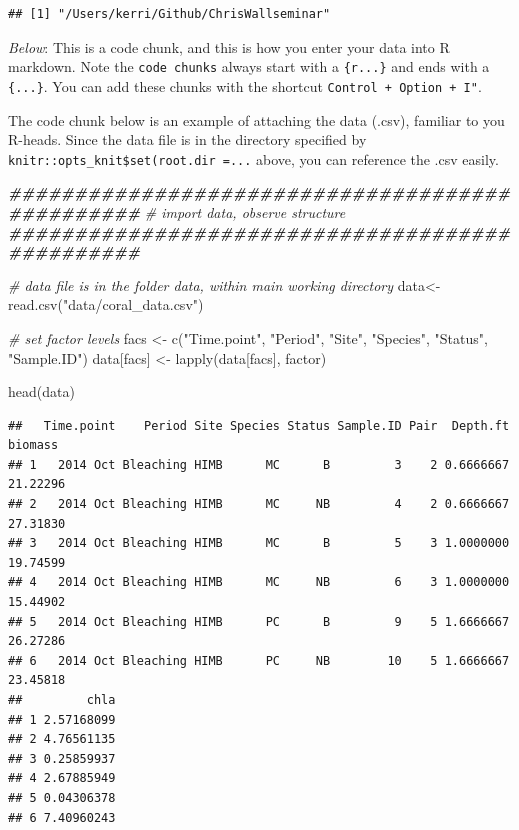 \documentclass[
]{article}
\newenvironment{Shaded}{\begin{snugshade}}{\end{snugshade}}
\newcommand{\CommentTok}[1]{\textcolor[rgb]{0.56,0.35,0.01}{\textit{#1}}}
\newcommand{\DocumentationTok}[1]{\textcolor[rgb]{0.56,0.35,0.01}{\textbf{\textit{#1}}}}
\newcommand{\FunctionTok}[1]{\textcolor[rgb]{0.00,0.00,0.00}{#1}}
\newcommand{\NormalTok}[1]{#1}
\newcommand{\OtherTok}[1]{\textcolor[rgb]{0.56,0.35,0.01}{#1}}
\newcommand{\StringTok}[1]{\textcolor[rgb]{0.31,0.60,0.02}{#1}}
\begin{document}
\begin{verbatim}
## [1] "/Users/kerri/Github/ChrisWallseminar"
\end{verbatim}

\emph{Below}: This is a code chunk, and this is how you enter your data
into R markdown. Note the \texttt{code\ chunks} always start with a
\texttt{\textasciigrave{}\textasciigrave{}\textasciigrave{}\{r...\}} and
ends with a \texttt{\{...\}}. You can add these chunks with the shortcut
\texttt{Control\ +\ Option\ +\ I"}.

The code chunk below is an example of attaching the data (.csv),
familiar to you R-heads. Since the data file is in the directory
specified by \texttt{knitr::opts\_knit\$set(root.dir\ =...} above, you
can reference the .csv easily.

\begin{Shaded}
\begin{Highlighting}[]
\DocumentationTok{\#\#\#\#\#\#\#\#\#\#\#\#\#\#\#\#\#\#\#\#\#\#\#\#\#\#\#\#\#\#\#\#\#\#\#\#\#\#\#\#\#\#\#\#\#\#\#\#}
\CommentTok{\# import data, observe structure}
\DocumentationTok{\#\#\#\#\#\#\#\#\#\#\#\#\#\#\#\#\#\#\#\#\#\#\#\#\#\#\#\#\#\#\#\#\#\#\#\#\#\#\#\#\#\#\#\#\#\#\#\#}

\CommentTok{\# data file is in the folder \textquotesingle{}data\textquotesingle{}, within main working directory}
\NormalTok{data}\OtherTok{\textless{}{-}}\FunctionTok{read.csv}\NormalTok{(}\StringTok{"data/coral\_data.csv"}\NormalTok{)}

\CommentTok{\# set factor levels}
\NormalTok{facs }\OtherTok{\textless{}{-}} \FunctionTok{c}\NormalTok{(}\StringTok{"Time.point"}\NormalTok{, }\StringTok{"Period"}\NormalTok{, }\StringTok{"Site"}\NormalTok{, }\StringTok{"Species"}\NormalTok{, }\StringTok{"Status"}\NormalTok{, }\StringTok{"Sample.ID"}\NormalTok{)}
\NormalTok{data[facs] }\OtherTok{\textless{}{-}} \FunctionTok{lapply}\NormalTok{(data[facs], factor)}

\FunctionTok{head}\NormalTok{(data) }
\end{Highlighting}
\end{Shaded}

\begin{verbatim}
##   Time.point    Period Site Species Status Sample.ID Pair  Depth.ft  biomass
## 1   2014 Oct Bleaching HIMB      MC      B         3    2 0.6666667 21.22296
## 2   2014 Oct Bleaching HIMB      MC     NB         4    2 0.6666667 27.31830
## 3   2014 Oct Bleaching HIMB      MC      B         5    3 1.0000000 19.74599
## 4   2014 Oct Bleaching HIMB      MC     NB         6    3 1.0000000 15.44902
## 5   2014 Oct Bleaching HIMB      PC      B         9    5 1.6666667 26.27286
## 6   2014 Oct Bleaching HIMB      PC     NB        10    5 1.6666667 23.45818
##         chla
## 1 2.57168099
## 2 4.76561135
## 3 0.25859937
## 4 2.67885949
## 5 0.04306378
## 6 7.40960243
\end{verbatim}
\end{document}
